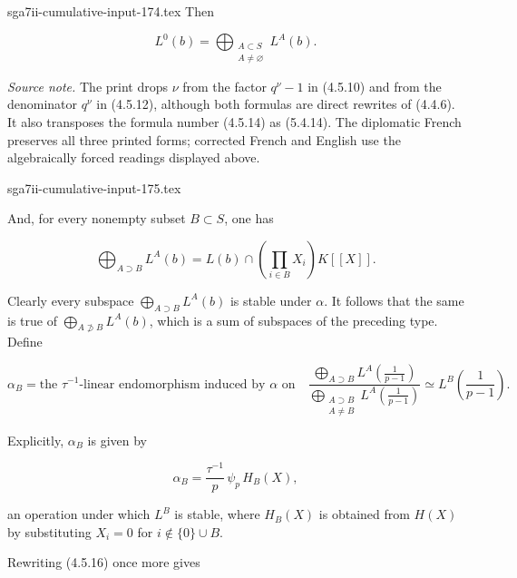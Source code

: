 \begin{filecontents*}{sga7ii-cumulative-input-174.tex}
Then

\begin{equation}\tag{4.5.19}
L^0(b)=\bigoplus_{\substack{A\subset S\\A\ne\varnothing}}L^A(b).
\end{equation}

\medskip
\noindent\emph{Source note.}
The print drops $\nu$ from the factor $q^\nu-1$ in (4.5.10) and from the
denominator $q^\nu$ in (4.5.12), although both formulas are direct rewrites
of (4.4.6). It also transposes the formula number (4.5.14) as (5.4.14).
The diplomatic French preserves all three printed forms; corrected French
and English use the algebraically forced readings displayed above.
\end{filecontents*}
\begin{filecontents*}{sga7ii-cumulative-input-175.tex}
\par\medskip
And, for every nonempty subset $B\subset S$, one has

\begin{equation}\tag{4.5.20}
\bigoplus_{A\supset B}L^A(b)
=L(b)\cap\left(\prod_{i\in B}X_i\right)K[[X]].
\end{equation}

Clearly every subspace $\bigoplus_{A\supset B}L^A(b)$ is stable under
$\alpha$. It follows that the same is true of
$\bigoplus_{A\not\supset B}L^A(b)$, which is a sum of subspaces of the
preceding type. Define

\begin{equation}\tag{4.5.21}
\alpha_B=\text{the $\tau^{-1}$-linear endomorphism induced by $\alpha$ on}
\quad
\frac{\displaystyle\bigoplus_{A\supset B}
L^A\!\left(\frac1{p-1}\right)}
{\displaystyle\bigoplus_{\substack{A\supset B\\A\ne B}}
L^A\!\left(\frac1{p-1}\right)}
\simeq L^B\!\left(\frac1{p-1}\right).
\end{equation}

Explicitly, $\alpha_B$ is given by

\begin{equation}\tag{4.5.22}
\alpha_B=\frac{\tau^{-1}}p\,\psi_p\,H_B(X),
\end{equation}

an operation under which $L^B$ is stable, where $H_B(X)$ is obtained from
$H(X)$ by substituting $X_i=0$ for $i\notin\{0\}\cup B$.

Rewriting (4.5.16) once more gives


\end{filecontents*}
